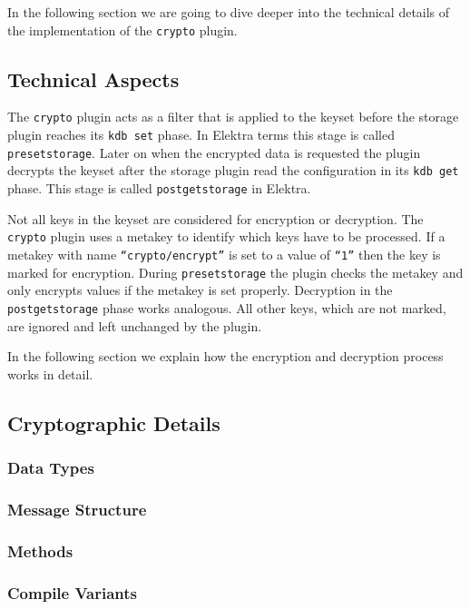 In the following section we are going to dive deeper into the technical details of the implementation of the \texttt{crypto} plugin.

\subsection{Technical Aspects}

The \texttt{crypto} plugin acts as a filter that is applied to the keyset before the storage plugin reaches its \texttt{kdb set} phase.
In Elektra terms this stage is called \texttt{presetstorage}.
Later on when the encrypted data is requested the plugin decrypts the keyset after the storage plugin read the configuration in its \texttt{kdb get} phase.
This stage is called \texttt{postgetstorage} in Elektra.

Not all keys in the keyset are considered for encryption or decryption.
The \texttt{crypto} plugin uses a metakey to identify which keys have to be processed.
If a metakey with name \texttt{``crypto/encrypt''} is set to a value of \texttt{``1''} then the key is marked for encryption.
During \texttt{presetstorage} the plugin checks the metakey and only encrypts values if the metakey is set properly.
Decryption in the \texttt{postgetstorage} phase works analogous.
All other keys, which are not marked, are ignored and left unchanged by the plugin.

In the following section we explain how the encryption and decryption process works in detail.

\subsection{Cryptographic Details}

\subsubsection{Data Types}



\subsubsection{Message Structure}

\subsubsection{Methods}

\subsubsection{Compile Variants}

